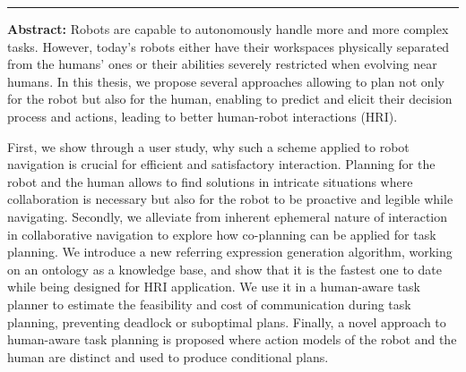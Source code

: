 \documentclass[english,a4paper,11pt,twoside]{StyleThese}
\begin{document}
\cleardoublepage
\begin{vcenterpage}
\noindent\rule[2pt]{\textwidth}{0.5pt}

\textbf{Abstract:}
Robots are capable to autonomously handle more and more complex tasks. However, today's robots either have their workspaces physically separated from the humans' ones or their abilities severely restricted when evolving near humans. In this thesis, we propose several approaches allowing to plan not only for the robot but also for the human, enabling to predict and elicit their decision process and actions, leading to better human-robot interactions (HRI). 

First, we show through a user study, why such a scheme applied to robot navigation is crucial for efficient and satisfactory interaction. Planning for the robot and the human allows to find solutions in intricate situations where collaboration is necessary but also for the robot to be proactive and legible while navigating. Secondly, we alleviate from inherent ephemeral nature of interaction in collaborative navigation to explore how co-planning can be applied for task planning. We introduce a new referring expression generation algorithm, working on an ontology as a knowledge base, and show that it is the fastest one to date while being designed for HRI application. We use it in a human-aware task planner to estimate the feasibility and cost of communication during task planning, preventing deadlock or suboptimal plans. Finally, a novel approach to human-aware task planning is proposed where action models of the robot and the human are distinct and used to produce conditional plans.
\begin{comment}
As technology progresses, more and more complex tasks can be automated. However, robots seldom consider the nearby humans in their decision making processes. This results in today robots usage to be separated from human environment or to be overdefensive when evolving close to humans. We claim that bringing the robot and the human workspace closer would allow to use their complementarity to perform more complex tasks in collaboration, more efficiently and with more satisfaction for the human.


\end{comment}
\end{vcenterpage}
\end{document}
